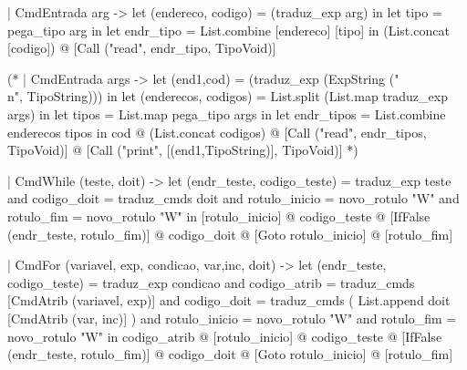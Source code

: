 \documentclass[12pt,a4paper,twoside]{article}
\begin{document}
\begin{terminal}
  | CmdEntrada arg -> 
      let (endereco, codigo) =  (traduz_exp arg) in
      let tipo = pega_tipo arg in
      let endr_tipo = List.combine [endereco] [tipo] in
      (List.concat [codigo]) @
      [Call ("read", endr_tipo, TipoVoid)]

  (* | CmdEntrada args -> 
      let (end1,cod) = (traduz_exp (ExpString ("\\n", TipoString))) in
      let (enderecos, codigos) = List.split (List.map traduz_exp args) in
      let tipos = List.map pega_tipo args in
      let endr_tipos = List.combine enderecos tipos in
      cod @
      (List.concat codigos) @
      [Call ("read", endr_tipos, TipoVoid)] @
      [Call ("print", [(end1,TipoString)], TipoVoid)] *)
      
          
  | CmdWhile (teste, doit) ->
    let (endr_teste, codigo_teste) = traduz_exp teste 
    and codigo_doit = traduz_cmds doit
    and rotulo_inicio = novo_rotulo "W"
    and rotulo_fim = novo_rotulo "W"  in
      [rotulo_inicio] @ codigo_teste         @ [IfFalse (endr_teste, rotulo_fim)] @
      codigo_doit     @ [Goto rotulo_inicio] @ [rotulo_fim]       

  | CmdFor (variavel, exp, condicao, var,inc, doit) ->
    let (endr_teste, codigo_teste) = traduz_exp condicao 
    and codigo_atrib = traduz_cmds [CmdAtrib (variavel, exp)]
    and codigo_doit = traduz_cmds ( List.append doit [CmdAtrib (var, inc)] )
    and rotulo_inicio = novo_rotulo "W"
    and rotulo_fim = novo_rotulo "W" in
      codigo_atrib @ [rotulo_inicio]      @ codigo_teste @ [IfFalse (endr_teste, rotulo_fim)] @
      codigo_doit  @ [Goto rotulo_inicio] @ [rotulo_fim]


\end{terminal}
\end{document}
